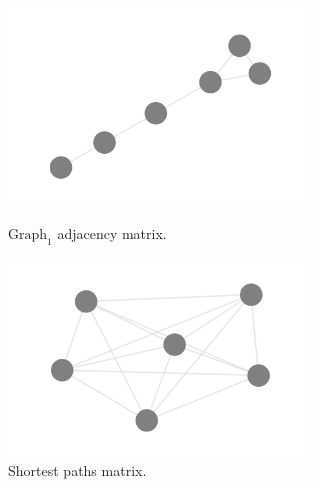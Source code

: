 \documentclass[11pt,a4paper]{article}
\begin{document}
\begin{figure}[H]
	\begin{minipage}[t]{0.5\linewidth}
		\centering
		\includegraphics[width=0.7\textwidth]{img/acidovorax_graph_2am.png}
		\caption{$\text{Graph}_1$ adjacency matrix.}
		\label{f1}
	\end{minipage}
	\hspace{0.1cm}
	\begin{minipage}[t]{0.5\linewidth} 
		\centering
		\includegraphics[width=0.7\textwidth]{img/acidovorax_graph_2sp.png}
		\caption{Shortest paths matrix.}
		\label{g1_w}
	\end{minipage}        
\end{figure}
\end{document}
